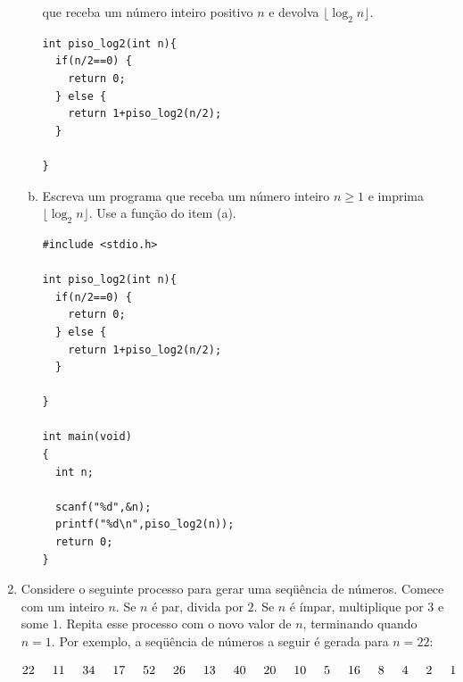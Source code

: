 \documentclass[a4paper,10pt]{article}
\begin{document}
\begin{enumerate}
\begin{enumerate}[(a)]
que receba um número inteiro positivo $n$ e devolva $\lfloor \log_2 n \rfloor$. 

\begin{lstlisting}
int piso_log2(int n){
  if(n/2==0) {
    return 0;
  } else {
    return 1+piso_log2(n/2);
  }

}
\end{lstlisting}

\item Escreva um programa que receba um número inteiro $n \geq 1$ e imprima $\lfloor \log_2 n \rfloor$. 
Use a função do item (a).

\begin{lstlisting}
#include <stdio.h>

int piso_log2(int n){
  if(n/2==0) {
    return 0;
  } else {
    return 1+piso_log2(n/2);
  }

}

int main(void)
{
  int n;

  scanf("%d",&n);
  printf("%d\n",piso_log2(n));
  return 0;
}
\end{lstlisting}



\end{enumerate}

\pagebreak

\item Considere o seguinte processo para gerar uma seqüência de números.
Comece com um inteiro $n$. Se $n$ é par, divida por $2$.
Se $n$ é ímpar, multiplique por $3$ e some $1$. 
Repita esse processo com o novo valor de $n$, terminando quando $n = 1$.
Por exemplo, a seqüência de números a seguir é gerada para $n = 22$:

  \[
  22 \hspace*{.5cm} 11 \hspace*{.5cm} 34 \hspace*{.5cm} 17 
  \hspace*{.5cm} 52 \hspace*{.5cm} 26 \hspace*{.5cm} 13 \hspace*{.5cm} 
  40 \hspace*{.5cm} 20 \hspace*{.5cm} 10 \hspace*{.5cm} 5
  \hspace*{.5cm} 16 \hspace*{.5cm} 8 \hspace*{.5cm} 4 \hspace*{.5cm} 2
  \hspace*{.5cm} 1   
  \]


\end{enumerate}
\end{document}
